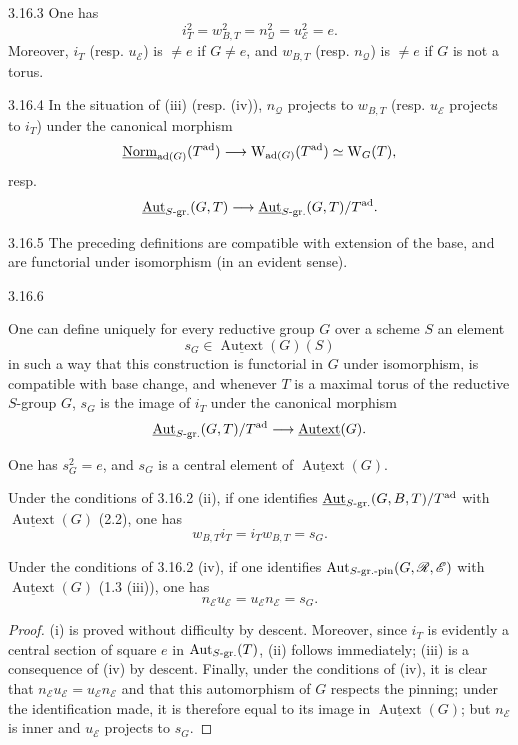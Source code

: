 \begin{corollary}{3.16.3}\label{XXIV.3.16.3}
One has
\[
i_T^2=w_{B,T}^2=n_{\mathscr Q}^2=u_{\mathscr E}^2=e.
\]
Moreover, $i_T$ (resp. $u_{\mathscr E}$) is $\ne e$ if $G\ne e$, and $w_{B,T}$ (resp. $n_{\mathscr Q}$) is $\ne e$ if $G$ is not a torus.
\end{corollary}
\begin{corollary}{3.16.4}\label{XXIV.3.16.4}
In the situation of (iii) (resp. (iv)), $n_{\mathscr Q}$ projects to $w_{B,T}$ (resp. $u_{\mathscr E}$ projects to $i_T$) under the canonical morphism
\[
\underline{\mathrm{Norm}}_{\operatorname{ad}(G)}(T^{\mathrm{ad}})\longrightarrow\mathrm W_{\operatorname{ad}(G)}(T^{\mathrm{ad}})\simeq\mathrm W_G(T),
\]
resp.
\[
\underline{\operatorname{Aut}}_{S\text{-gr.}}(G,T)\longrightarrow\underline{\operatorname{Aut}}_{S\text{-gr.}}(G,T)/T^{\mathrm{ad}}.
\]
\end{corollary}
\begin{corollary}{3.16.5}\label{XXIV.3.16.5}
The preceding definitions are compatible with extension of the base, and are functorial under isomorphism (in an evident sense).
\end{corollary}
\begin{proposition}{3.16.6}\label{XXIV.3.16.6}
\begin{enumeratei}
\item One can define uniquely for every reductive group $G$ over a scheme $S$ an element
\[
s_G\in\underline{\operatorname{Autext}}(G)(S)
\]
in such a way that this construction is functorial in $G$ under isomorphism, is compatible with base change, and whenever $T$ is a maximal torus of the reductive $S$-group $G$, $s_G$ is the image of $i_T$ under the canonical morphism
\[
\underline{\operatorname{Aut}}_{S\text{-gr.}}(G,T)/T^{\mathrm{ad}}\longrightarrow\underline{\operatorname{Autext}}(G).
\]
\item One has $s_G^2=e$, and $s_G$ is a central element of $\underline{\operatorname{Autext}}(G)$.
\item Under the conditions of 3.16.2 (ii), if one identifies $\underline{\operatorname{Aut}}_{S\text{-gr.}}(G,B,T)/T^{\mathrm{ad}}$ with $\underline{\operatorname{Autext}}(G)$ (2.2), one has
\[
w_{B,T}i_T=i_Tw_{B,T}=s_G.
\]
\item Under the conditions of 3.16.2 (iv), if one identifies $\operatorname{Aut}_{S\text{-gr.-pin}}(G,\mathscr R,\mathscr E)$ with $\underline{\operatorname{Autext}}(G)$ (1.3 (iii)), one has
\[
n_{\mathscr E}u_{\mathscr E}=u_{\mathscr E}n_{\mathscr E}=s_G.
\]
\end{enumeratei}
\end{proposition}
\begin{proof}
(i) is proved without difficulty by descent. Moreover, since $i_T$ is evidently a central section of square $e$ in $\operatorname{Aut}_{S\text{-gr.}}(T)$, (ii) follows immediately; (iii) is a consequence of (iv) by descent. Finally, under the conditions of (iv), it is clear that $n_{\mathscr E}u_{\mathscr E}=u_{\mathscr E}n_{\mathscr E}$ and that this automorphism of $G$ respects the pinning; under the identification made, it is therefore equal to its image in $\underline{\operatorname{Autext}}(G)$; but $n_{\mathscr E}$ is inner and $u_{\mathscr E}$ projects to $s_G$.
\end{proof}
